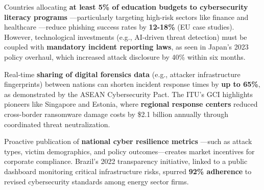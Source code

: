 
Countries allocating \textbf{at least 5\% of education budgets to cybersecurity literacy programs}
—particularly targeting high-risk sectors like finance and healthcare
—reduce phishing success rates by \textbf{12-18\%} (EU case studies).
However, technological investments (e.g., AI-driven threat detection)
must be coupled with \textbf{mandatory incident reporting laws},
as seen in Japan’s 2023 policy overhaul, which increased attack disclosure by 40\% within six months.

Real-time \textbf{sharing of digital forensics data} (e.g., attacker infrastructure fingerprints)
between nations can shorten incident response times by \textbf{up to 65\%},
as demonstrated by the ASEAN Cybersecurity Pact.
The ITU’s GCI highlights pioneers like Singapore and Estonia,
where \textbf{regional response centers} reduced cross-border ransomware damage
costs by \$2.1 billion annually through coordinated threat neutralization.

Proactive publication of \textbf{national cyber resilience metrics}
—such as attack types, victim demographics, and policy outcomes—creates market incentives for corporate compliance.
Brazil’s 2022 transparency initiative, linked to a public dashboard monitoring critical infrastructure risks,
spurred \textbf{92\% adherence} to revised cybersecurity standards among energy sector firms.
